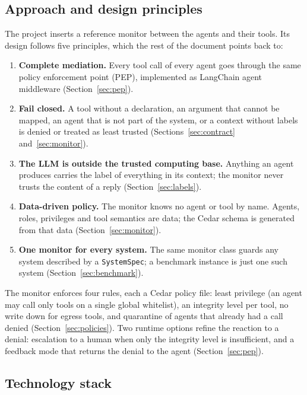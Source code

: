 \documentclass[11pt,a4paper]{article}
\DeclareRobustCommand{\code}[1]{{\renewcommand{\_}{\textunderscore\allowbreak}\texttt{#1}}}
\begin{document}
\subsection{Approach and design principles}

The project inserts a reference monitor between the agents and their tools. Its design
follows five principles, which the rest of the document points back to:

\begin{enumerate}
  \item \textbf{Complete mediation.} Every tool call of every agent goes through the same
        policy enforcement point (PEP), implemented as LangChain agent middleware
        (Section~\ref{sec:pep}).
  \item \textbf{Fail closed.} A tool without a declaration, an argument that cannot be
        mapped, an agent that is not part of the system, or a context without labels is
        denied or treated as least trusted (Sections~\ref{sec:contract} and~\ref{sec:monitor}).
  \item \textbf{The LLM is outside the trusted computing base.} Anything an agent produces
        carries the label of everything in its context; the monitor never trusts the
        content of a reply (Section~\ref{sec:labels}).
  \item \textbf{Data-driven policy.} The monitor knows no agent or tool by name. Agents,
        roles, privileges and tool semantics are data; the Cedar schema is generated from
        that data (Section~\ref{sec:monitor}).
  \item \textbf{One monitor for every system.} The same monitor class guards any system
        described by a \code{SystemSpec}; a benchmark instance is just one such system
        (Section~\ref{sec:benchmark}).
\end{enumerate}

The monitor enforces four rules, each a Cedar policy file: least privilege (an agent may
call only tools on a single global whitelist), an integrity level per tool, no write down
for egress tools, and quarantine of agents that already had a call denied
(Section~\ref{sec:policies}). Two runtime options refine the reaction to a denial:
escalation to a human when only the integrity level is insufficient, and a feedback mode
that returns the denial to the agent (Section~\ref{sec:pep}).

\subsection{Technology stack}
\end{document}
